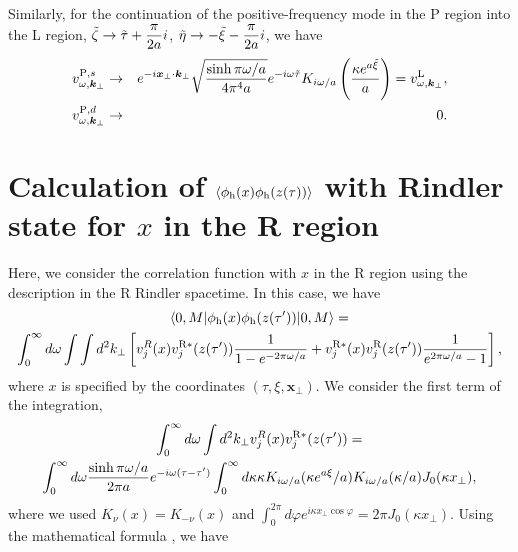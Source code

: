 \documentclass[aps,prd,preprintnumbers,nofootinbib,showpacs,11pt]{revtex4}%
\begin{document}
\begin{widetext}
Similarly, for the continuation of the positive-frequency mode in the P region into the L region, 
 $\displaystyle{\tilde\zeta\rightarrow\tilde\tau+{\pi \over 2a }i}$,
 $\displaystyle{\tilde\eta\rightarrow-\tilde\xi-{\pi \over 2a}i}$,
we have
\begin{eqnarray}
v^{{\rm P},s}_{\omega,\bm k_\perp}&\rightarrow&{e^{-i\bm x_\perp\cdot\bm k_\perp}}\sqrt{\sinh\pi\omega/a\over 4\pi^4a}e^{-i\omega\tilde\tau}K_{i\omega/a} 
\left({\kappa e^{a\tilde\xi}\over a}\right)=v^{\rm L}_{\omega,\bm k_\perp},
\\
v^{{\rm P},d}_{\omega,\bm k_\perp}&\rightarrow&0.
\end{eqnarray}


\section{Calculation of $\langle\phi_{\rm h}(x)\phi_{\rm h}(z(\tau))\rangle$ with Rindler state for $x$
in the R region}
Here, we consider the correlation function with $x$ in the R region using the description 
in the R Rindler spacetime. In this case, we have 
\begin{multline}
\langle0,M|\phi_{\rm h}(x)\phi_{\rm h}(z(\tau'))|0,M\rangle =\\
\int_0^\infty d\omega \int \int d^2 k_\perp
\left[v_j^R(x)v_j^{\rm R*}(z(\tau')){1\over 1-e^{-2\pi \omega/a}}
+v_j^{\rm R*}(x)v_j^{\rm R}(z(\tau')){1\over e^{2\pi \omega/a}-1}\right],
\end{multline}
where $x$ is specified by the coordinates $(\tau,\xi,\bm x_\perp)$.
We consider the first term of the integration, 
\begin{multline}
\int_0^\infty d\omega \int d^2k_\perp v_j^R(x)v_j^{\rm R*}(z(\tau'))
= \\ \int_0^\infty d\omega {\sinh \pi \omega /a\over 2\pi a} e^{-i\omega(\tau-\tau')} 
\int_0^\infty d\kappa\kappa
K_{i\omega/a}(\kappa e^{a\xi}/a) K_{i\omega/a}(\kappa /a) J_0(\kappa x_\perp),
\label{vv}
\end{multline}
where we used $K_\nu(x)=K_{-\nu}(x)$ and $\int_0^{2\pi}d\varphi e^{i\kappa x_\perp\cos\varphi}
=2\pi J_0(\kappa x_\perp)$. 
%
Using the mathematical 
formula \cite{typo}, we have

\end{widetext}
\end{document}
